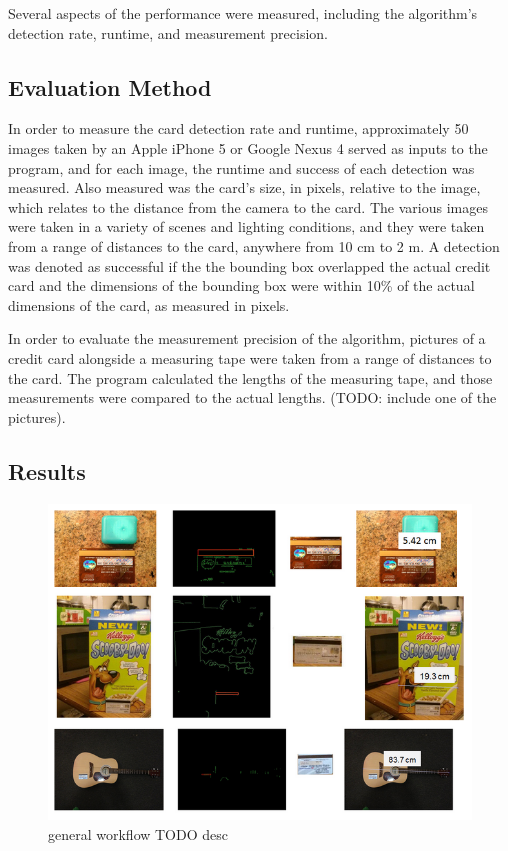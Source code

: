 \documentclass[10pt,twocolumn,letterpaper]{article}
\begin{document}
Several aspects of the performance were measured, including the algorithm’s detection rate, runtime, and measurement precision.

\subsection{Evaluation Method}

	In order to measure the card detection rate and runtime, approximately 50 images taken by an Apple iPhone 5 or Google Nexus 4 served as inputs to the program, and for each image, the runtime and success of each detection was measured. Also measured was the card’s size, in pixels, relative to the image, which relates to the distance from the camera to the card. The various images were taken in a variety of scenes and lighting conditions, and they were taken from a range of distances to the card, anywhere from 10 cm to 2 m. A detection was denoted as successful if the the bounding box overlapped the actual credit card and the dimensions of the bounding box were within 10\% of the actual dimensions of the card, as measured in pixels. 

	In order to evaluate the measurement precision of the algorithm, pictures of a credit card alongside a measuring tape were taken from a range of distances to the card. The program calculated the lengths of the measuring tape, and those measurements were compared to the actual lengths. (TODO: include one of the pictures).
\subsection{Results}

\begin{figure}
\begin{center}
	   \includegraphics[width=0.8\linewidth]{general-workflow}
\end{center}
   \caption{general workflow TODO desc}
\label{fig:general-workflow}
\end{figure}
\end{document}
